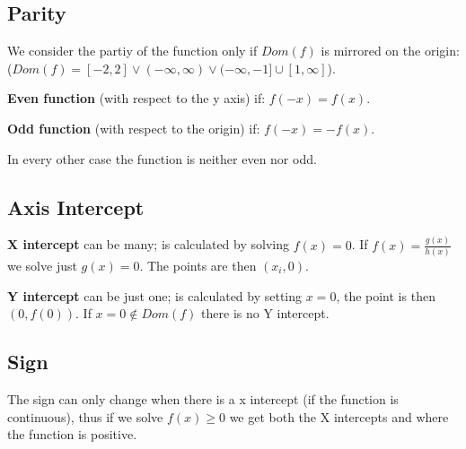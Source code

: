 \documentclass[8pt,a4paper]{extarticle}     %
\theoremstyle{definition}
\theoremstyle{definition}
\theoremstyle{definition}
\begin{document}
\begin{multicols}{4}
\subsection{Parity}
We consider the partiy of the function only if $Dom(f)$ is mirrored on the origin: \\ ($Dom(f) = [-2,2] \lor (-\infty, \infty) \lor (-\infty, -1] \cup [1, \infty]$).
\begin{bulletlist}
	\item \textbf{Even function} (with respect to the y axis) if: $f(-x)=f(x)$.	
	\item \textbf{Odd function} (with respect to the origin) if: $f(-x)=-f(x)$.
	\item In every other case the function is neither even nor odd. 
\end{bulletlist}
\subsection{Axis Intercept}
\begin{bulletlist}
	\item \textbf{X intercept} can be many; is calculated by solving $f(x) = 0$. If $f(x) = \frac{g(x)}{h(x)}$ we solve just $g(x)=0$. The points are then $(x_i,0)$. 
	\item \textbf{Y intercept} can be just one; is calculated by setting $x=0$, the point is then $(0, f(0))$. If $x=0\notin Dom(f)$ there is no Y intercept.
\end{bulletlist}
\subsection{Sign}
The sign can only change when there is a x intercept (if the function is continuous), thus if we solve $f(x) \geq 0$ we get both the X intercepts and where the function is positive. 

\end{multicols}
\end{document}
